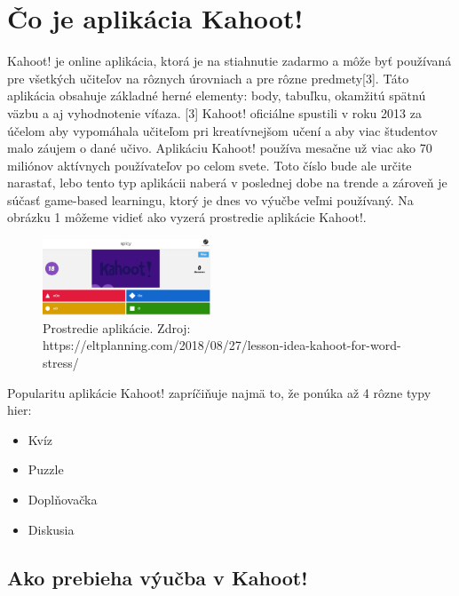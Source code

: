 \documentclass[10pt,oneside,slovak,a4paper]{article}
\begin{document}
\section{Čo je aplikácia Kahoot!} \label{ina}
Kahoot! je online aplikácia, ktorá je na stiahnutie zadarmo a môže byť používaná pre všetkých učiteľov na rôznych úrovniach a pre rôzne predmety[3]. Táto aplikácia obsahuje základné herné  elementy: body, tabuľku, okamžitú spätnú väzbu a aj vyhodnotenie víťaza. [3] Kahoot! oficiálne spustili v roku 2013 za účelom aby vypomáhala učiteľom pri kreatívnejšom učení a aby viac študentov malo záujem o dané učivo.  Aplikáciu Kahoot! používa mesačne už viac ako 70 miliónov aktívnych používateľov po celom svete\cite{Licorish}. Toto číslo bude ale určite narastať, lebo tento typ aplikácii naberá v poslednej dobe na trende a zároveň je súčasť game-based learningu, ktorý je dnes vo výučbe veľmi používaný. 
Na obrázku 1 môžeme vidieť ako vyzerá prostredie aplikácie Kahoot!.
\bigskip
\begin{figure}[h] %
\centering
\includegraphics[width=5cm]{kahoot.png}
\caption{ Prostredie aplikácie.
Zdroj: https://eltplanning.com/2018/08/27/lesson-idea-kahoot-for-word-stress/}
\end{figure}


Popularitu aplikácie Kahoot! zapríčiňuje najmä to, že ponúka až 4 rôzne typy hier\cite{Licorish}:
\begin{itemize}
\item	Kvíz
\item	Puzzle
\item	Doplňovačka
\item	Diskusia


\end {itemize}
\subsection{Ako prebieha výučba v Kahoot!} 
\end{document}
